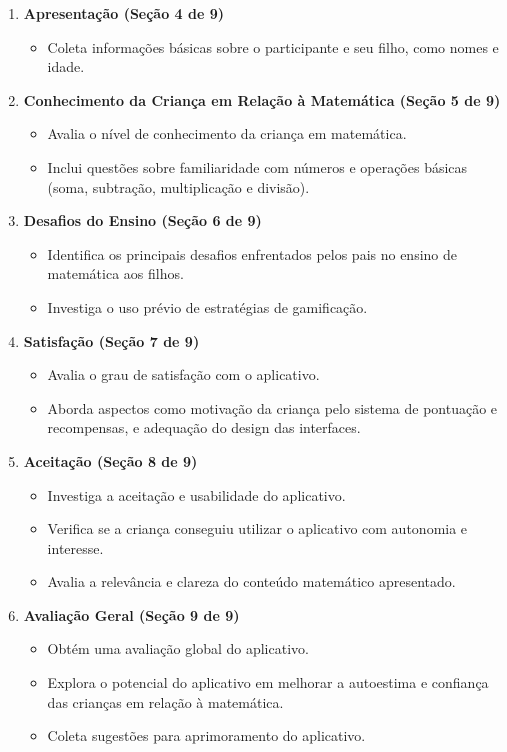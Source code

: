\begin{enumerate}
    \item \textbf{Apresentação (Seção 4 de 9)}
    \begin{itemize}
        \item Coleta informações básicas sobre o participante e seu filho, como nomes e idade.
    \end{itemize}
    \item \textbf{Conhecimento da Criança em Relação à Matemática (Seção 5 de 9)}
    \begin{itemize}
        \item Avalia o nível de conhecimento da criança em matemática.
        \item Inclui questões sobre familiaridade com números e operações básicas (soma, subtração, multiplicação e divisão).
    \end{itemize}
    \item \textbf{Desafios do Ensino (Seção 6 de 9)}
    \begin{itemize}
        \item Identifica os principais desafios enfrentados pelos pais no ensino de matemática aos filhos.
        \item Investiga o uso prévio de estratégias de gamificação.
    \end{itemize}
    \item \textbf{Satisfação (Seção 7 de 9)}
    \begin{itemize}
        \item Avalia o grau de satisfação com o aplicativo.
        \item Aborda aspectos como motivação da criança pelo sistema de pontuação e recompensas, e adequação do design das interfaces.
    \end{itemize}
    \item \textbf{Aceitação (Seção 8 de 9)}
    \begin{itemize}
        \item Investiga a aceitação e usabilidade do aplicativo.
        \item Verifica se a criança conseguiu utilizar o aplicativo com autonomia e interesse.
        \item Avalia a relevância e clareza do conteúdo matemático apresentado.
    \end{itemize}
    \item \textbf{Avaliação Geral (Seção 9 de 9)}
    \begin{itemize}
        \item Obtém uma avaliação global do aplicativo.
        \item Explora o potencial do aplicativo em melhorar a autoestima e confiança das crianças em relação à matemática.
        \item Coleta sugestões para aprimoramento do aplicativo.
    \end{itemize}
\end{enumerate}

